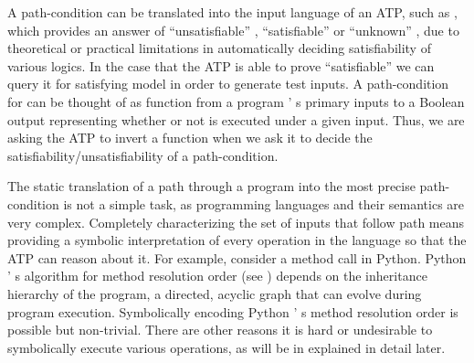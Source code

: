 \documentclass{IOS-Book-Article}
\begin{document}
\begin{mdP}[class={indent},data-line={105}]%
{}A path-condition can be translated into the input
language of an ATP, such as%
{}{\mdNbsp}%
{}%
{}, which provides an answer
of %
{}{\textquotedblleft}unsatisfiable{\textquotedblright}%
{}, %
{}{\textquotedblleft}satisfiable{\textquotedblright}%
{} or %
{}{\textquotedblleft}unknown{\textquotedblright}%
{}, due to theoretical or practical
limitations in automatically deciding satisfiability of various logics.
In the case that the ATP is able to prove %
{}{\textquotedblleft}satisfiable{\textquotedblright}%
{} we can query it for 
satisfying model in order to generate test inputs. A path-condition 
for %
{}%
{} can be thought of as function from a
program%
{}{'}%
{}s primary inputs to a Boolean output representing whether
or not %
{}%
{} is executed under a given input. Thus, we are asking
the ATP to invert a function when we ask it to decide
the satisfiability/unsatisfiability of a path-condition.%
\end{mdP}%
\begin{mdP}[class={indent},data-line={117}]%
{}The static translation of a path %
{}%
{} through a program %
{}%
{} into 
the most precise path-condition %
{}%
{} is not a simple task, as 
programming languages and their semantics are very complex.
Completely characterizing the set of inputs %
{}%
{} that follow
path %
{}%
{} means providing a symbolic interpretation of 
every operation in the language so that the
ATP can reason about it. For example, consider a method call in Python. 
Python%
{}{'}%
{}s algorithm for method resolution order (see%
{}{\mdNbsp}%
{})
depends on the inheritance hierarchy of the program, a directed, 
acyclic graph that can evolve during program execution. Symbolically
encoding Python%
{}{'}%
{}s method resolution order is possible but non-trivial.
There are other reasons it is hard or undesirable to symbolically 
execute various operations, as will be in explained in detail later.%
\end{mdP}%
\end{document}

